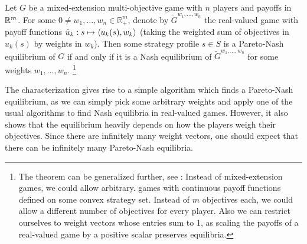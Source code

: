 \documentclass[a4paper]{scrreprt}
\newcommand{\Rp}{\mathbb{R}_+}
\begin{document}
    \begin{thm}~\\
        Let $G$ be a mixed-extension multi-objective game with $n$ players and payoffs in $\mathbb{R}^m$. 
        For some $0 \neq w_1, \dots, w_n \in \Rp^m$, denote by $\tilde{G}^{w_1, \dots, w_n}$ the real-valued game with payoff functions
        $\tilde{u}_k: s \mapsto \left\langle u_k(s), w_k \right\rangle$ (taking the weighted sum of objectives in $u_k(s)$ by weights in $w_k$).
        Then some strategy profile $s \in S$ is a Pareto-Nash equilibrium of $G$ if and only if it is a Nash equilibrium of $\tilde{G}^{w_1, \dots, w_n}$ for some weights $w_1, \dots, w_n$.
        \footnote{The theorem can be generalized further, see \cite{bib:shapleyMultiobjectiveEquilibriumPoints,bib:paretoNashEquilibria}: Instead of mixed-extension games, we could allow arbitrary. games with continuous payoff functions defined on some convex strategy set.  Instead of $m$ objectives each, we could allow a different number of objectives for every player.
        Also we can restrict ourselves to weight vectors whose entries sum to 1, as scaling the payoffs of a real-valued game by a positive scalar preserves equilibria.
        }
        \label{thm:paretoNashEquilibriaWeightingCharacterization}
    \end{thm}

    The characterization gives rise to a simple algorithm which finds a Pareto-Nash equilibrium, as we can simply pick some arbitrary weights and apply one of the usual algorithms to find Nash equilibria in real-valued games.
    However, it also shows that the equilibrium heavily depends on how the players weigh their objectives. Since there are infinitely many weight vectors, one should expect that there can be infinitely many Pareto-Nash equilibria. 
    
\end{document}

